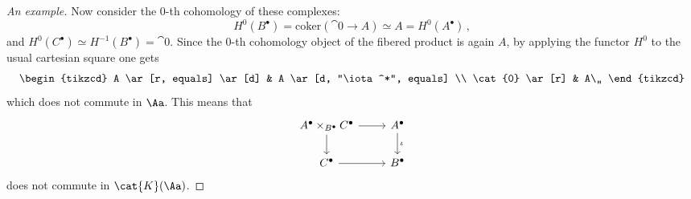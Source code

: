 \begin{exercise}
\begin{proof}[An example]
        Now consider the $0$-th cohomology of these complexes:
        \begin{equation*}
            H^{0}(B^{\bullet}) 
            = \mathrm{coker}\left( \cat{0} \to A \right)
            \simeq A = H^{0}(A^{\bullet})\,,
        \end{equation*}
        and $H^{0}(C^{\bullet}) \simeq H^{-1}(B^{\bullet}) = \cat{0}$.
        Since the $0$-th cohomology object
        of the fibered product is again $A$,
        by applying the functor $H^{0}$ to the usual
        cartesian square one gets
        \begin{equation*}
            \begin{tikzcd}
                A \ar[r, equals] \ar[d] & A \ar[d, "\iota^*", equals] \\
                \cat{0} \ar[r] & A\,,
            \end{tikzcd}
        \end{equation*}
        which does not commute in $\Aa$. This means that
        \begin{equation*}
            \begin{tikzcd}
                A^{\bullet} \times_{B^{\bullet}} C^{\bullet}
                \ar[r] \ar[d] & A^{\bullet} \ar[d,"\iota"]\\
                C^{\bullet} \ar[r] & B^{\bullet}
            \end{tikzcd}
        \end{equation*}
        does not commute in $\cat{K}(\Aa)$.
    \end{proof}
\end{exercise}